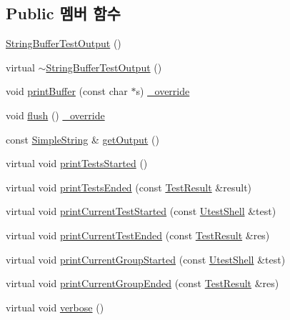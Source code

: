 \subsection*{Public 멤버 함수}
\begin{DoxyCompactItemize}
\item 
\hyperlink{class_string_buffer_test_output_abd5dd3dcbf8fbf71fb1858b9dcc12c1a}{String\+Buffer\+Test\+Output} ()
\item 
virtual \hyperlink{class_string_buffer_test_output_ab3833615aa36fa2efa045fab3a830dbe}{$\sim$\+String\+Buffer\+Test\+Output} ()
\item 
void \hyperlink{class_string_buffer_test_output_a8b83bd531b9e38a5dd9c61e14bf1636c}{print\+Buffer} (const char $\ast$s) \hyperlink{_cpp_u_test_config_8h_a049bea15dd750e15869863c94c1efc3b}{\+\_\+override}
\item 
void \hyperlink{class_string_buffer_test_output_a9fde218af86a81b79f82b86f3ddeabe5}{flush} () \hyperlink{_cpp_u_test_config_8h_a049bea15dd750e15869863c94c1efc3b}{\+\_\+override}
\item 
const \hyperlink{class_simple_string}{Simple\+String} \& \hyperlink{class_string_buffer_test_output_a17a31248a362b3190d2b195ba2a9616f}{get\+Output} ()
\item 
virtual void \hyperlink{class_test_output_a1c2b129bfdc2b392ffa618864707dd89}{print\+Tests\+Started} ()
\item 
virtual void \hyperlink{class_test_output_acc5ba82a215510b66f5f294258686dd4}{print\+Tests\+Ended} (const \hyperlink{class_test_result}{Test\+Result} \&result)
\item 
virtual void \hyperlink{class_test_output_aa3e637e450766d2d1a6090f2bab8bf08}{print\+Current\+Test\+Started} (const \hyperlink{class_utest_shell}{Utest\+Shell} \&test)
\item 
virtual void \hyperlink{class_test_output_a67acd3c53695126b4728c7da0d2b0b51}{print\+Current\+Test\+Ended} (const \hyperlink{class_test_result}{Test\+Result} \&res)
\item 
virtual void \hyperlink{class_test_output_afe801c9e014df78dd6cd5e199ba8c6e0}{print\+Current\+Group\+Started} (const \hyperlink{class_utest_shell}{Utest\+Shell} \&test)
\item 
virtual void \hyperlink{class_test_output_a037b2a87826c7f59e7353cb137deacae}{print\+Current\+Group\+Ended} (const \hyperlink{class_test_result}{Test\+Result} \&res)
\item 
virtual void \hyperlink{class_test_output_a2ae0a8d48809abb33b5ba47c56fdc3ad}{verbose} ()

\end{DoxyCompactItemize}

